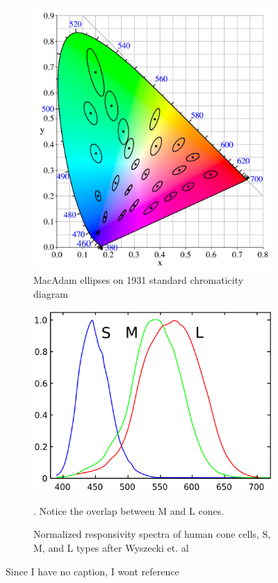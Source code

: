 \begin{figure}[htbp]
	\centering
	\begin{subfigure}[t]{.35\textwidth}
		\centering
		\includegraphics[width=\textwidth]{_external/media/CIExy1931_MacAdam.png}
	\caption{MacAdam ellipses on 1931 standard chromaticity diagram 
		\cite{wiki:macadam:2017}}
	\end{subfigure}
	\begin{subfigure}[t]{.5\textwidth}
		\centering
		\includegraphics[width=\textwidth]{_external/media/1280px-Cones_SMJ2_E.png}
		\caption{Normalized responsivity spectra of human cone cells, S, M, and 
		L types after Wyszecki et. al \cite{wiki:Wyszecki:2017}}. Notice the 
		overlap between M and L cones.
	\end{subfigure}
	\caption{Since I have no caption, I wont reference}
	\label{fig:greenscreen:stimula}	
\end{figure}

